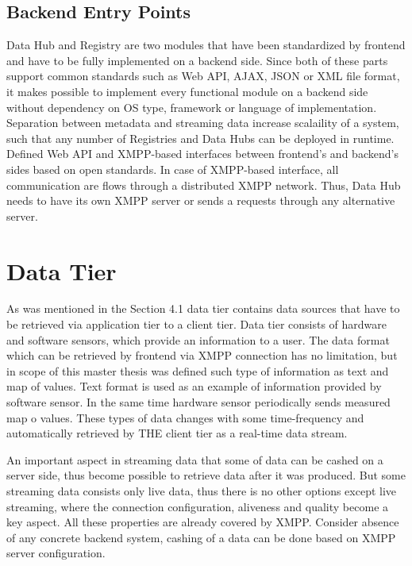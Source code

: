 \subsection{Backend Entry Points}
    Data Hub and Registry are two modules that have been standardized by frontend and have to be fully implemented on a backend side. Since both of these parts support common standards such as Web API, AJAX, JSON or XML file format, it makes possible to implement every functional module on a backend side without dependency on OS type, framework or language of implementation. Separation between metadata and streaming data increase scalaility of a system, such that any number of Registries and Data Hubs can be deployed in runtime. Defined Web API and XMPP-based interfaces between frontend's and backend's sides based on open standards. In case of XMPP-based interface, all communication are flows through a distributed XMPP network. Thus, Data Hub needs to have its own XMPP server or sends a requests through any alternative server.

\section{Data Tier}
   As was mentioned in the Section 4.1 data tier contains data sources that have to be retrieved via application tier to a client tier. Data tier consists of hardware and software sensors, which provide an information to a user. The data format which can be retrieved by frontend via XMPP connection has no limitation, but in scope of this master thesis was defined such type of information as text and map of values. Text format is used as an example of information provided by software sensor. In the same time hardware sensor periodically sends measured map o values. These types of data changes with some time-frequency and automatically retrieved by THE client tier as a real-time data stream.

  An important aspect in streaming data that some of data can be cashed on a server side, thus become possible to retrieve data after it was produced. But some streaming data consists only live data, thus there is no other options except live streaming, where the connection configuration, aliveness and quality become a key aspect. All these properties are already covered by XMPP. Consider absence of any concrete backend system, cashing of a data can be done based on XMPP server configuration. 

